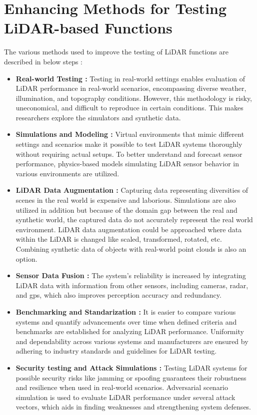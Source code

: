 \section{Enhancing Methods for Testing LiDAR-based Functions}
The various methods used to improve the testing of LiDAR functions are described in below steps :
\begin{itemize}
    \item \textbf{Real-world Testing : }
    Testing in real-world settings enables evaluation of LiDAR performance in real-world scenarios, encompassing diverse weather, illumination, and topography conditions.  However, this methodology is risky, uneconomical, and difficult to reproduce in certain conditions. This makes researchers explore the simulators and synthetic data.
    \item \textbf{Simulations and Modeling : }
    Virtual environments that mimic different settings and scenarios make it possible to test LiDAR systems thoroughly without requiring actual setups.  To better understand and forecast sensor performance, physics-based models simulating LiDAR sensor behavior in various environments are utilized.
    \item \textbf{LiDAR Data Augmentation : }
    Capturing data representing diversities of scenes in the real world is expensive and laborious. Simulations are also utilized in addition but because of the domain gap between the real and synthetic world, the captured data do not accurately represent the real world environment. LiDAR data augmentation could be approached where data within the LiDAR is changed like scaled, transformed, rotated, etc. Combining synthetic data of objects with real-world point clouds is also an option.
    \item \textbf{Sensor Data Fusion : }
    The system's reliability is increased by integrating LiDAR data with information from other sensors, including cameras, radar, and \acrshort{gps}, which also improves perception accuracy and redundancy.
    \item \textbf{Benchmarking and Standarization : }
    It is easier to compare various systems and quantify advancements over time when defined criteria and benchmarks are established for analyzing LiDAR performance. Uniformity and dependability across various systems and manufacturers are ensured by adhering to industry standards and guidelines for LiDAR testing.
    \item \textbf{Security testing and Attack Simulations : }
    Testing LiDAR systems for possible security risks like jamming or spoofing guarantees their robustness and resilience when used in real-world scenarios.  Adversarial scenario simulation is used to evaluate LiDAR performance under several attack vectors, which aids in finding weaknesses and strengthening system defenses.
\end{itemize}

